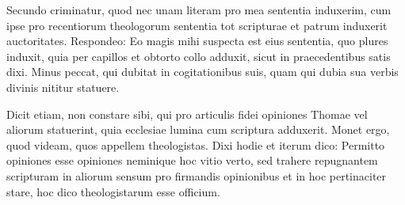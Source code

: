 Secundo criminatur, quod nec unam literam pro mea sententia induxerim, cum ipse pro recentiorum theologorum sententia tot scripturae et patrum induxerit auctoritates. Respondeo: Eo magis mihi suspecta est eius sententia, quo plures induxit, quia per capillos et obtorto collo adduxit, sicut in praecedentibus satis dixi. Minus peccat, qui dubitat in cogitationibus suis, quam qui dubia sua verbis divinis nititur statuere.

Dicit etiam, non constare sibi, qui pro articulis fidei opiniones Thomae vel aliorum statuerint, quia ecclesiae lumina cum scriptura adduxerit. Monet ergo, quod videam, quos appellem theologistas. Dixi hodie et iterum dico: Permitto opiniones esse opiniones neminique hoc vitio verto, sed trahere repugnantem scripturam in aliorum sensum pro firmandis opinionibus et in hoc pertinaciter stare, hoc dico theologistarum esse officium.

